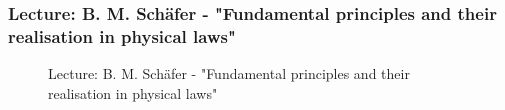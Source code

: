 \documentclass[11pt,a4paper]{article}
\numberwithin{equation}{section}
\numberwithin{table}{section}\setlength{\multlinegap}{25pt}
\begin{document}
\subsubsection{Lecture: B. M. Sch\"afer - "Fundamental principles and their realisation in physical laws"}

\begin{figure}[H]
\centering
\null\hfill %
\hfill %
\hfill %
\hfill %
\hfill\null %
\caption{Lecture: B. M. Sch\"afer - "Fundamental principles and their realisation in physical laws"}
\end{figure}
\end{document}
